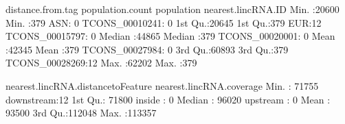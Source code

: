 \documentclass[a4paper]{article}
\begin{document}
\begin{Schunk}
\begin{Soutput}
 distance.from.tag population.count population      nearest.lincRNA.ID
 Min.   :20600     Min.   :379      ASN: 0     TCONS_00010241: 0      
 1st Qu.:20645     1st Qu.:379      EUR:12     TCONS_00015797: 0      
 Median :44865     Median :379                 TCONS_00020001: 0      
 Mean   :42345     Mean   :379                 TCONS_00027984: 0      
 3rd Qu.:60893     3rd Qu.:379                 TCONS_00028269:12      
 Max.   :62202     Max.   :379                                        
                                                                      
 nearest.lincRNA.distancetoFeature nearest.lincRNA.coverage
 Min.   : 71755                    downstream:12           
 1st Qu.: 71800                    inside    : 0           
 Median : 96020                    upstream  : 0           
 Mean   : 93500                                            
 3rd Qu.:112048                                            
 Max.   :113357                                            
                                                           

\end{Soutput}
\end{Schunk}
\end{document}
